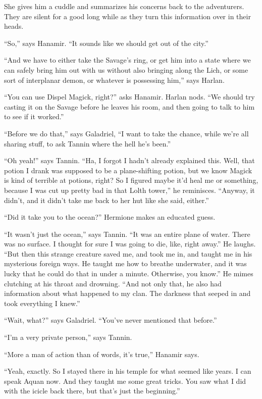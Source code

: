 \documentclass[smalldemyvopaper,11pt,twoside,onecolumn,openright,extrafontsizes]{memoir}
\begin{document}
She gives him a cuddle and summarizes his concerns back to the
adventurers. They are silent for a good long while as they turn this
information over in their heads.

``So,'' says Hanamir. ``It sounds like we should get out of the city.''

``And we have to either take the Savage's ring, or get him into a state
where we can safely bring him out with us without also bringing along
the Lich, or some sort of interplanar demon, or whatever is possessing
him,'' says Harlan.

``You can use Dispel Magick, right?'' asks Hanamir. Harlan nods. ``We
should try casting it on the Savage before he leaves his room, and then
going to talk to him to see if it worked.''

``Before we do that,'' says Galadriel, ``I want to take the chance,
while we're all sharing stuff, to ask Tannin where the hell he's been.''

``Oh yeah!'' says Tannin. ``Ha, I forgot I hadn't already explained
this. Well, that potion I drank was supposed to be a plane-shifting
potion, but we know Magick is kind of terrible at potions, right? So I
figured maybe it'd heal me or something, because I was cut up pretty bad
in that Lolth tower,'' he reminisces. ``Anyway, it didn't, and it didn't
take me back to her hut like she said, either.''

``Did it take you to the ocean?'' Hermione makes an educated guess.

``It wasn't just the ocean,'' says Tannin. ``It was an entire plane of
water. There was no surface. I thought for sure I was going to die,
like, right away.'' He laughs. ``But then this strange creature saved
me, and took me in, and taught me in his mysterious foreign ways. He
taught me how to breathe underwater, and it was lucky that he could do
that in under a minute. Otherwise, you know.'' He mimes clutching at his
throat and drowning. ``And not only that, he also had information about
what happened to my clan. The darkness that seeped in and took
everything I knew.''

``Wait, what?'' says Galadriel. ``You've never mentioned that before.''

``I'm a very private person,'' says Tannin.

``More a man of action than of words, it's true,'' Hanamir says.

``Yeah, exactly. So I stayed there in his temple for what seemed like
years. I can speak Aquan now. And they taught me some great tricks. You
saw what I did with the icicle back there, but that's just the
beginning.''
\end{document}
